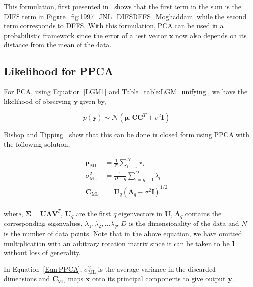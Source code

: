 This formulation, first presented in~\cite{1997_JNL_EigenTRK_Moghaddam} shows that the first term in the sum is the DIFS term in Figure~\ref{fig:1997_JNL_DIFSDFFS_Moghaddam} while the second term corresponds to DFFS.  With this formulation, PCA can be used in a probabilistic framework since the error of a test vector $\mathbf{x}$ now also depends on its distance from the mean of the data.

\subsection{Likelihood for PPCA}
For PCA, using Equation~\ref{LGM1} and Table~\ref{table:LGM_unifying}, we have the likelihood of observing $\mathbf{y}$ given by,

\begin{equation}
p(\mathbf{y}) \sim \mathcal{N}(\boldsymbol\mu, \mathbf{C}\mathbf{C}^T + \sigma^2 \mathbf{I})
\end{equation}

Bishop and Tipping~\cite{1999_JNL_PPCA_Tipping} show that this can be done in closed form using PPCA with the following solution,

\begin{equation}
\begin{array}{lllll}
\mathbf{\boldsymbol\mu}_{\textrm{ML}} &=\frac{1}{N}\sum\limits_{i=1}^N \mathbf{x}_i\\
\sigma^2_{\textrm{ML}} &= \frac{1}{D-q}\sum\limits_{i=q+1}^D \lambda_i\\
\mathbf{C}_{\textrm{ML}} &= \mathbf{U}_q(\mathbf{\Lambda}_q - \sigma^2\mathbf{I})^{1/2} \\
\end{array}
\label{Eqn:PPCA}
\end{equation}

where, $\boldsymbol\Sigma = \mathbf{U}\mathbf{\Lambda}\mathbf{V}^T$, $\mathbf{U}_q$ are the first $q$ eigenvectors in $\mathbf{U}$, $\mathbf{\Lambda}_q$ contains the corresponding eigenvalues, $\lambda_1, \lambda_2, \ldots \lambda_q$, $D$ is the dimensionality of the data and $N$ is the number of data points.  Note that in the above equation, we have omitted multiplication with an arbitrary rotation matrix since it can be taken to be $\mathbf{I}$ without loss of generality.  

In Equation~\ref{Eqn:PPCA}, $\sigma^2_{\textrm{ML}}$ is the average variance in the discarded dimensions and $\mathbf{C}_{\textrm{ML}}$ maps $\mathbf{x}$ onto its principal components to give output $\mathbf{y}$.





